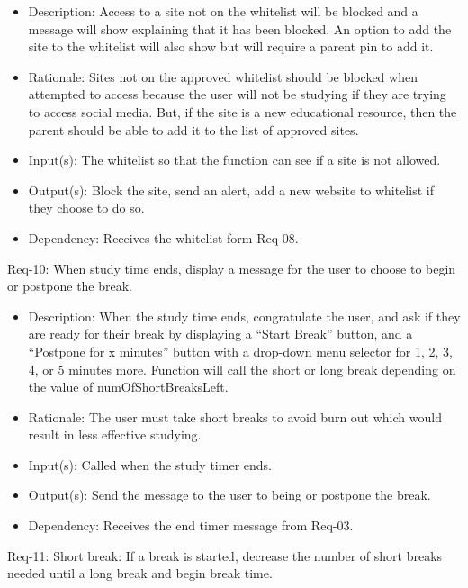 \documentclass[12pt]{article}
\begin{document}
\begin{itemize}
    \item Description: Access to a site not on the whitelist will be blocked and a message will show explaining that it has been blocked. An option to add the site to the whitelist will also show but will require a parent pin to add it.
    \item Rationale: Sites not on the approved whitelist should be blocked when attempted to access because the user will not be studying if they are trying to access social media. But, if the site is a new educational resource, then the parent should be able to add it to the list of approved sites. 
    \item Input(s): The whitelist so that the function can see if a site is not allowed.
    \item Output(s): Block the site, send an alert, add a new website to whitelist if they choose to do so.
    \item Dependency: Receives the whitelist form Req-08.
\end{itemize}
Req-10: When study time ends, display a message for the user to choose to begin or postpone the break.
\begin{itemize}
    \item Description: When the study time ends, congratulate the user, and ask if they are ready for their break by displaying a “Start Break” button, and a “Postpone for x minutes” button with a drop-down menu selector for 1, 2, 3, 4, or 5 minutes more. Function will call the short or long break depending on the value of numOfShortBreaksLeft.
    \item Rationale: The user must take short breaks to avoid burn out which would result in less effective studying.
    \item Input(s): Called when the study timer ends.
    \item Output(s): Send the message to the user to being or postpone the break.
    \item Dependency: Receives the end timer message from Req-03.
\end{itemize}
Req-11: Short break: If a break is started, decrease the number of short breaks needed until a long break and begin break time.
\end{document}
